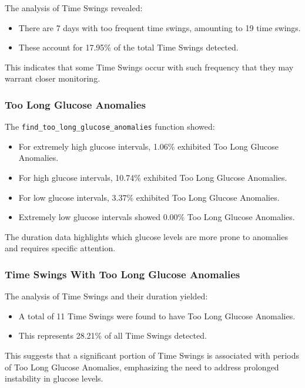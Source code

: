\documentclass{article}
\begin{document}
The analysis of Time Swings revealed:

\begin{itemize}
    \item There are 7 days with too frequent time swings, amounting to 19 time swings.
    \item These account for 17.95\% of the total Time Swings detected.
\end{itemize}

This indicates that some Time Swings occur with such frequency that they may warrant closer monitoring.

\subsubsection{Too Long Glucose Anomalies}

The \texttt{find\_too\_long\_glucose\_anomalies} function showed:

\begin{itemize}
    \item For extremely high glucose intervals, 1.06\% exhibited Too Long Glucose Anomalies.
    \item For high glucose intervals, 10.74\% exhibited Too Long Glucose Anomalies.
    \item For low glucose intervals, 3.37\% exhibited Too Long Glucose Anomalies.
    \item Extremely low glucose intervals showed 0.00\% Too Long Glucose Anomalies.

\end{itemize}

The duration data highlights which glucose levels are more prone to anomalies and requires specific attention.

\subsubsection{Time Swings With Too Long Glucose Anomalies}

The analysis of Time Swings and their duration yielded:

\begin{itemize}
    \item A total of 11 Time Swings were found to have Too Long Glucose Anomalies.
    \item This represents 28.21\% of all Time Swings detected.
\end{itemize}

This suggests that a significant portion of Time Swings is associated with periods of Too Long Glucose Anomalies, emphasizing the need to address prolonged instability in glucose levels.
\end{document}
